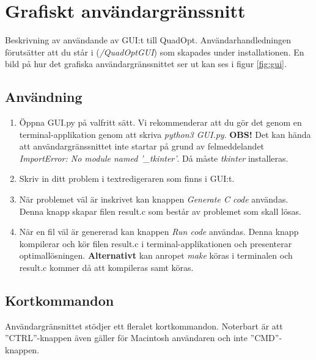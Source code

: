 \section{Grafiskt användargränssnitt}
Beskrivning av användande av GUI:t till QuadOpt. Användarhandledningen förutsätter att du står i (\emph{/QuadOptGUI}) som skapades under installationen. En bild på hur det grafiska användargränssnittet ser ut kan ses i figur \ref{fig:gui}.


\subsection{Användning}
\begin{enumerate}
\item Öppna GUI.py på valfritt sätt. Vi rekommenderar att du gör det genom en terminal-applikation genom att skriva \emph{python3 GUI.py}.
\newline
\newline
\textbf{OBS!} Det kan hända att användargränssnittet inte startar på grund av felmeddelandet \emph{ImportError: No module named '\_tkinter'}. Då måste \emph{tkinter} installeras.
\item Skriv in ditt problem i textredigeraren som finns i GUI:t.
\item När problemet väl är inskrivet kan knappen \emph{Generate C code} användas. Denna knapp skapar filen result.c som består av problemet som skall lösas.
\item När en fil väl är genererad kan knappen \emph{Run code} användas. Denna knapp kompilerar och kör filen result.c i terminal-applikationen och presenterar optimallösningen. 
\newline
\newline
\textbf{Alternativt} kan anropet \emph{make} köras i terminalen och result.c kommer då att kompileras samt köras.
\end{enumerate}

\subsection{Kortkommandon}
Användargränsnittet stödjer ett fleralet kortkommandon. Noterbart är att ''CTRL''-knappen även gäller för Macintosh användaren och inte ''CMD''-knappen. 

